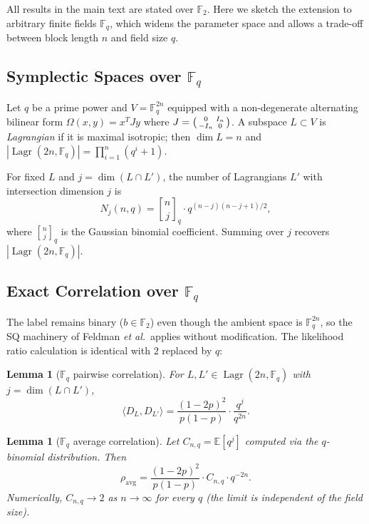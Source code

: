 \documentclass[11pt,a4paper]{article}
\theoremstyle{plain}
\newtheorem{lemma}[theorem]{Lemma}
\theoremstyle{definition}
\newcommand{\F}{\mathbb{F}}
\newcommand{\E}{\mathbb{E}}
\DeclareMathOperator{\Lagr}{Lagr}
\newcommand{\etal}{\textit{et al.}}
\begin{document}
All results in the main text are stated over $\F_2$. Here we sketch the extension to arbitrary finite fields $\F_q$, which widens the parameter space and allows a trade-off between block length $n$ and field size $q$.

\subsection{Symplectic Spaces over $\F_q$}
\label{subsec:fq-symplectic}

Let $q$ be a prime power and $V = \F_q^{2n}$ equipped with a non-degenerate alternating bilinear form $\Omega(x,y) = x^T J y$ where $J = \begin{psmallmatrix} 0 & I_n \\ -I_n & 0 \end{psmallmatrix}$. A subspace $L \subset V$ is \emph{Lagrangian} if it is maximal isotropic; then $\dim L = n$ and $|\Lagr(2n,\F_q)| = \prod_{i=1}^n (q^i+1)$.

For fixed $L$ and $j = \dim(L \cap L')$, the number of Lagrangians $L'$ with intersection dimension $j$ is
\[
N_j(n,q) = {n \brack j}_q \cdot q^{(n-j)(n-j+1)/2},
\]
where ${n \brack j}_q$ is the Gaussian binomial coefficient. Summing over $j$ recovers $|\Lagr(2n,\F_q)|$.

\subsection{Exact Correlation over $\F_q$}
\label{subsec:fq-corr}

The label remains binary ($b \in \F_2$) even though the ambient space is $\F_q^{2n}$, so the SQ machinery of Feldman \etal\ applies without modification. The likelihood ratio calculation is identical with $2$ replaced by $q$:

\begin{lemma}[$\F_q$ pairwise correlation]
\label{lem:fq-corr}
For $L,L' \in \Lagr(2n,\F_q)$ with $j = \dim(L \cap L')$,
\[
\langle D_L, D_{L'} \rangle = \frac{(1-2p)^2}{p(1-p)} \cdot \frac{q^j}{q^{2n}}.
\]
\end{lemma}

\begin{lemma}[$\F_q$ average correlation]
\label{lem:fq-avg}
Let $C_{n,q} = \E[q^j]$ computed via the $q$-binomial distribution. Then
\[
\rho_{\mathrm{avg}} = \frac{(1-2p)^2}{p(1-p)} \cdot C_{n,q} \cdot q^{-2n}.
\]
Numerically, $C_{n,q} \to 2$ as $n \to \infty$ for every $q$ (the limit is independent of the field size).
\end{lemma}
\end{document}
